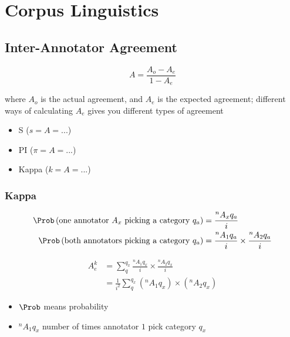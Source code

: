 \chapter{Corpus Linguistics}

\section{Inter-Annotator Agreement}

  \begin{equation}
    A = \frac{A_{o} - A_{e}}{1 - A_{e}}
  \end{equation}

  where $ A_{o} $ is the actual agreement, and $ A_{e} $ is the expected
  agreement; different ways of calculating $ A_{e} $ gives you different
  types of agreement

  \begin{itemize}
    \item S ($ s = A = ... $)
    \item PI ($ \pi = A = ... $)
    \item Kappa ($ k = A = ... $)
  \end{itemize}

  \subsection{Kappa}

    \begin{align}
      \Prob
      \left(
        \text{one annotator $ A_{x} $ picking a category $ q_{a} $}
      \right) &= \frac{^{n} A_{x} q_{a}}{i} \\
      \Prob
      \left(
        \text{both annotators picking a category $ q_{a} $}
      \right) &= \frac{^{n} A_{1} q_{a}}{i} \times \frac{^{n} A_{2} q_{a}}{i}
    \end{align}

    \begin{align}
      A_{e}^{k}
        &= \sum_{q}^{q_{x}} \frac{^{n} A_{1} q_{x}}{i} \times \frac{^{n} A_{2} q_{x}}{i} \\
        &= \frac{1}{i^{2}} \sum_{q}^{q_{x}} \left( ^{n} A_{1} q_{x} \right) \times \left( ^{n} A_{2} q_{x} \right)
    \end{align}

    \begin{itemize}
      \item $ \Prob $ means probability
      \item $ ^{n} A_{1} q_{x} $ number of times annotator $ 1 $ pick category $ q_{x} $
    \end{itemize}
